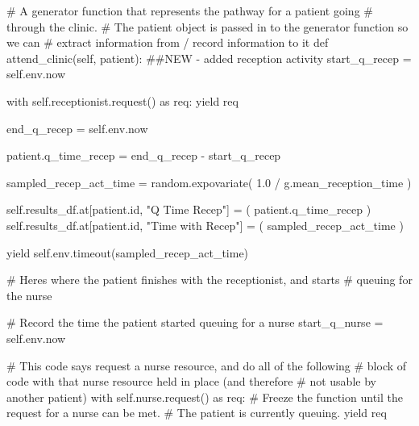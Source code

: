 \documentclass[
  letterpaper,
  DIV=11,
  numbers=noendperiod]{scrreprt}
\newenvironment{Shaded}{\begin{snugshade}}{\end{snugshade}}
\newcommand{\BuiltInTok}[1]{\textcolor[rgb]{0.00,0.23,0.31}{#1}}
\newcommand{\CommentTok}[1]{\textcolor[rgb]{0.37,0.37,0.37}{#1}}
\newcommand{\ControlFlowTok}[1]{\textcolor[rgb]{0.00,0.23,0.31}{#1}}
\newcommand{\FloatTok}[1]{\textcolor[rgb]{0.68,0.00,0.00}{#1}}
\newcommand{\ImportTok}[1]{\textcolor[rgb]{0.00,0.46,0.62}{#1}}
\newcommand{\KeywordTok}[1]{\textcolor[rgb]{0.00,0.23,0.31}{#1}}
\newcommand{\NormalTok}[1]{\textcolor[rgb]{0.00,0.23,0.31}{#1}}
\newcommand{\OperatorTok}[1]{\textcolor[rgb]{0.37,0.37,0.37}{#1}}
\newcommand{\StringTok}[1]{\textcolor[rgb]{0.13,0.47,0.30}{#1}}
\newcommand{\VariableTok}[1]{\textcolor[rgb]{0.07,0.07,0.07}{#1}}
\begin{document}
\begin{Shaded}
\begin{Highlighting}[]
 \CommentTok{\# A generator function that represents the pathway for a patient going}
    \CommentTok{\# through the clinic.}
    \CommentTok{\# The patient object is passed in to the generator function so we can}
    \CommentTok{\# extract information from / record information to it}
    \KeywordTok{def}\NormalTok{ attend\_clinic(}\VariableTok{self}\NormalTok{, patient):}
        \CommentTok{\#\#NEW {-} added reception activity}
\NormalTok{        start\_q\_recep }\OperatorTok{=} \VariableTok{self}\NormalTok{.env.now}

        \ControlFlowTok{with} \VariableTok{self}\NormalTok{.receptionist.request() }\ImportTok{as}\NormalTok{ req:}
            \ControlFlowTok{yield}\NormalTok{ req}

\NormalTok{            end\_q\_recep }\OperatorTok{=} \VariableTok{self}\NormalTok{.env.now}

\NormalTok{            patient.q\_time\_recep }\OperatorTok{=}\NormalTok{ end\_q\_recep }\OperatorTok{{-}}\NormalTok{ start\_q\_recep}

\NormalTok{            sampled\_recep\_act\_time }\OperatorTok{=}\NormalTok{ random.expovariate(}
                \FloatTok{1.0} \OperatorTok{/}\NormalTok{ g.mean\_reception\_time}
\NormalTok{            )}

            \VariableTok{self}\NormalTok{.results\_df.at[patient.}\BuiltInTok{id}\NormalTok{, }\StringTok{"Q Time Recep"}\NormalTok{] }\OperatorTok{=}\NormalTok{ (}
\NormalTok{                 patient.q\_time\_recep}
\NormalTok{            )}
            \VariableTok{self}\NormalTok{.results\_df.at[patient.}\BuiltInTok{id}\NormalTok{, }\StringTok{"Time with Recep"}\NormalTok{] }\OperatorTok{=}\NormalTok{ (}
\NormalTok{                 sampled\_recep\_act\_time}
\NormalTok{            )}

            \ControlFlowTok{yield} \VariableTok{self}\NormalTok{.env.timeout(sampled\_recep\_act\_time)}

        \CommentTok{\# Here\textquotesingle{}s where the patient finishes with the receptionist, and starts}
        \CommentTok{\# queuing for the nurse}

        \CommentTok{\# Record the time the patient started queuing for a nurse}
\NormalTok{        start\_q\_nurse }\OperatorTok{=} \VariableTok{self}\NormalTok{.env.now}

        \CommentTok{\# This code says request a nurse resource, and do all of the following}
        \CommentTok{\# block of code with that nurse resource held in place (and therefore}
        \CommentTok{\# not usable by another patient)}
        \ControlFlowTok{with} \VariableTok{self}\NormalTok{.nurse.request() }\ImportTok{as}\NormalTok{ req:}
            \CommentTok{\# Freeze the function until the request for a nurse can be met.}
            \CommentTok{\# The patient is currently queuing.}
            \ControlFlowTok{yield}\NormalTok{ req}


\end{Highlighting}
\end{Shaded}
\end{document}
